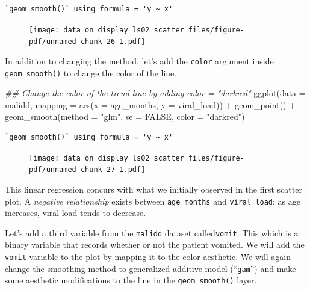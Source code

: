 \documentclass[
  letterpaper,
  DIV=11,
  numbers=noendperiod]{scrreprt}
\newenvironment{Shaded}{\begin{snugshade}}{\end{snugshade}}
\newcommand{\AttributeTok}[1]{\textcolor[rgb]{0.40,0.45,0.13}{#1}}
\newcommand{\ConstantTok}[1]{\textcolor[rgb]{0.56,0.35,0.01}{#1}}
\newcommand{\DocumentationTok}[1]{\textcolor[rgb]{0.37,0.37,0.37}{\textit{#1}}}
\newcommand{\FunctionTok}[1]{\textcolor[rgb]{0.28,0.35,0.67}{#1}}
\newcommand{\NormalTok}[1]{\textcolor[rgb]{0.00,0.23,0.31}{#1}}
\newcommand{\SpecialCharTok}[1]{\textcolor[rgb]{0.37,0.37,0.37}{#1}}
\newcommand{\StringTok}[1]{\textcolor[rgb]{0.13,0.47,0.30}{#1}}
\begin{document}
\begin{verbatim}
`geom_smooth()` using formula = 'y ~ x'
\end{verbatim}

\begin{figure}[H]

{\centering \texttt{[image: data\_on\_display\_ls02\_scatter\_files/figure-pdf/unnamed-chunk-26-1.pdf]}

}

\end{figure}

In addition to changing the method, let's add the \texttt{color}
argument inside \texttt{geom\_smooth()} to change the color of the line.

\begin{Shaded}
\begin{Highlighting}[]
\DocumentationTok{\#\# Change the color of the trend line by adding \textasciigrave{}color = "darkred"\textasciigrave{}}
\FunctionTok{ggplot}\NormalTok{(}\AttributeTok{data =}\NormalTok{ malidd, }
       \AttributeTok{mapping =} \FunctionTok{aes}\NormalTok{(}\AttributeTok{x =}\NormalTok{ age\_months, }
                     \AttributeTok{y =}\NormalTok{ viral\_load)) }\SpecialCharTok{+} 
  \FunctionTok{geom\_point}\NormalTok{() }\SpecialCharTok{+}
  \FunctionTok{geom\_smooth}\NormalTok{(}\AttributeTok{method =} \StringTok{"glm"}\NormalTok{,}
              \AttributeTok{se =} \ConstantTok{FALSE}\NormalTok{,}
              \AttributeTok{color =} \StringTok{"darkred"}\NormalTok{)}
\end{Highlighting}
\end{Shaded}

\begin{verbatim}
`geom_smooth()` using formula = 'y ~ x'
\end{verbatim}

\begin{figure}[H]

{\centering \texttt{[image: data\_on\_display\_ls02\_scatter\_files/figure-pdf/unnamed-chunk-27-1.pdf]}

}

\end{figure}

This linear regression concurs with what we initially observed in the
first scatter plot. A \emph{negative relationship} exists between
\texttt{age\_months} and \texttt{viral\_load}: as age increases, viral
load tends to decrease.

Let's add a third variable from the \texttt{malidd} dataset
called\texttt{vomit}. This which is a binary variable that records
whether or not the patient vomited. We will add the \texttt{vomit}
variable to the plot by mapping it to the color aesthetic. We will again
change the smoothing method to generalized additive model
(``\texttt{gam}'') and make some aesthetic modifications to the line in
the \texttt{geom\_smooth()} layer.
\end{document}
